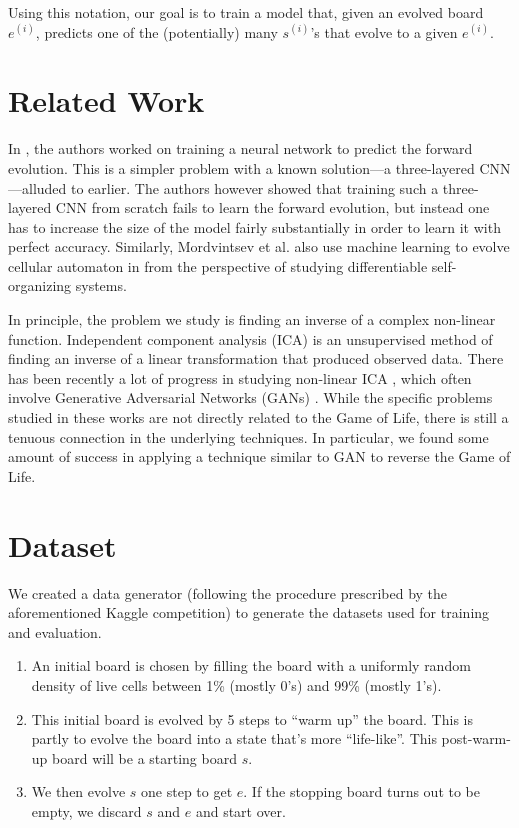 \documentclass[conference]{IEEEtran}
\begin{document}
Using this notation, our goal is to train a model that, given an evolved board $e^{(i)}$, predicts one of the (potentially) many $s^{(i)}$'s that evolve to a given $e^{(i)}$.

\section{Related Work}
In \cite{springer2020its}, the authors worked on training a neural network to predict the forward evolution. This is a simpler problem with a known solution---a three-layered CNN---alluded to earlier. The authors however showed that training such a three-layered CNN from scratch fails to learn the forward evolution, but instead one has to increase the size of the model fairly substantially in order to learn it with perfect accuracy. Similarly, Mordvintsev et al. also use machine learning to evolve cellular automaton in \cite{mordvintsev2020growing} from the perspective of studying differentiable self-organizing systems.

In principle, the problem we study is finding an inverse of a complex non-linear function. Independent component analysis (ICA)  is an unsupervised method of finding an inverse of a linear transformation that produced observed data. There has been recently a lot of progress in studying non-linear ICA \cite{hyvarinen2019nonlinear} \cite{brakel2017learning}, which often involve Generative Adversarial Networks (GANs) \cite{goodfellow2014generative}. While the specific problems studied in these works are not directly related to the Game of Life, there is still a tenuous connection in the underlying techniques. In particular, we found some amount of success in applying a technique similar to GAN to reverse the Game of Life.

\section{Dataset}
\label{dataset}
We created a data generator (following the procedure prescribed by the aforementioned Kaggle competition) to generate the datasets used for training and evaluation.

\begin{enumerate}
\item An initial board is chosen by filling the board with a uniformly random density of live cells between 1\% (mostly 0's) and 99\% (mostly 1's).
\item This initial board is evolved by 5 steps to ``warm up'' the board. This is partly to evolve the board into a state that's more ``life-like''. This post-warm-up board will be a starting board $s$.
\item We then evolve $s$ one step to get $e$. If the stopping board turns out to be empty, we discard $s$ and $e$ and start over.
\end{enumerate}
\end{document}
